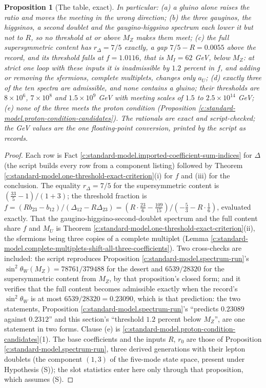 \documentclass[11pt]{article}
\newtheorem{proposition}[theorem]{Proposition}
\theoremstyle{definition}
\theoremstyle{plain}
\providecommand{\Dl}{}\renewcommand{\Dl}{\Delta}
\begin{document}
\begin{proposition}[The table, exact]
In particular: (a) a gluino alone raises the ratio and moves the meeting in the wrong direction; (b) the three gauginos, the higgsinos, a second doublet and the gaugino-higgsino spectrum each lower it but not to $R$, so no threshold at or above $M_{Z}$ makes them meet; (c) the full supersymmetric content has $r_{\Dl} = 7/5$ exactly, a gap $7/5 - R = 0.0055$ above the record, and its threshold falls at $f = 1.0116$, that is $M_{I} = 62$ GeV, below $M_{Z}$: at strict one loop with these inputs it is inadmissible by $1.2$ percent in $f$, and adding or removing the sfermions, complete multiplets, changes only $a_{U}$; (d) exactly three of the ten spectra are admissible, and none contains a gluino; their thresholds are $8 \times 10^{6}$, $7 \times 10^{8}$ and $1.5 \times 10^{9}$ GeV with meeting scales of $1.5$ to $2.5 \times 10^{14}$ GeV; (e) none of the three meets the proton condition (Proposition \ref{c:standard-model.proton-condition-candidates}). The rationals are exact and script-checked; the GeV values are the one floating-point conversion, printed by the script as records.
\end{proposition}
\begin{proof}
Each row is Fact \ref{c:standard-model.imported-coefficient-sum-indices} for $\Dl$ (the script builds every row from a component listing) followed by Theorem \ref{c:standard-model.one-threshold-exact-criterion}(i) for $f$ and (iii) for the conclusion. The equality $r_{\Dl} = 7/5$ for the supersymmetric content is $(\tfrac{33}{5} - 1)/(1 + 3)$; the threshold fraction is $f = (Rb_{23} - b_{12})/(\Dl_{12} - R\Dl_{23}) = (R \cdot \tfrac{23}{6} - \tfrac{109}{15})/(-\tfrac53 - R \cdot \tfrac16)$, evaluated exactly. That the gaugino-higgsino-second-doublet spectrum and the full content share $f$ and $M_{U}$ is Theorem \ref{c:standard-model.one-threshold-exact-criterion}(ii), the sfermions being three copies of a complete multiplet (Lemma \ref{c:standard-model.complete-multiplets-shift-all-three-coefficients}). Two cross-checks are included: the script reproduces Proposition \ref{c:standard-model.spectrum-run}'s $\sin^{2}\theta_{W}(M_{Z}) = 78761/379488$ for the desert and $6539/28320$ for the supersymmetric content from $M_{Z}$, by that proposition's closed form; and it verifies that the full content becomes admissible exactly when the record's $\sin^{2}\theta_{W}$ is at most $6539/28320 = 0.23090$, which is that prediction: the two statements, Proposition \ref{c:standard-model.spectrum-run}'s ``predicts $0.23089$ against $0.2312$'' and this section's ``threshold $1.2$ percent below $M_{Z}$'', are one statement in two forms. Clause (e) is \ref{c:standard-model.proton-condition-candidates}(1). The base coefficients and the inputs $R$, $r_{0}$ are those of Proposition \ref{c:standard-model.spectrum-run}, three derived generations with their lepton doublets (the component $(1,3)$ of the five-mode state space, present under Hypothesis (S)); the slot statistics enter here only through that proposition, which assumes (S).

\end{proof}
\end{document}
